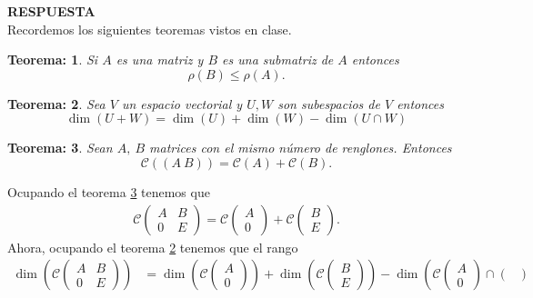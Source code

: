 \documentclass[11pt,letterpaper]{article}
\newcommand{\mcC}{\mathcal{C}}
\newcommand{\res}{\textbf{RESPUESTA}\\}
\newtheorem{thmt}{Teorema:}
\begin{document}
\begin{enumerate}
\res Recordemos los siguientes teoremas vistos en clase. 
\begin{framed}
    \begin{thmt} \label{submatriz}
	Si $A$ es una matriz y $B$ es una submatriz de $A$ entonces$$\rho(B)\leq \rho(A).$$
    \end{thmt}
\end{framed}

\begin{framed}
    \begin{thmt} \label{dimension_2}
	Sea $V$ un espacio vectorial y $U,W$ son subespacios de $V$ entonces 
	$$\dim(U+W)=\dim(U)+\dim(W)-\dim(U\cap W)$$
    \end{thmt}
\end{framed}

\begin{framed}
    \begin{thmt} \label{matrices}
	Sean $A, \ B$ matrices con el mismo número de renglones. Entonces
	$$\mcC((A\ B))=\mcC(A)+\mcC(B).$$
    \end{thmt}
\end{framed}
Ocupando el teorema \ref{matrices} tenemos que
\begin{align*}
\mcC\begin{pmatrix}
A&B\\
0&E
\end{pmatrix}=\mcC\begin{pmatrix}
A\\
0
\end{pmatrix}+\mcC\begin{pmatrix}
B\\
E
\end{pmatrix}.
\end{align*}
Ahora, ocupando el teorema \ref{dimension_2} tenemos que el rango 
\begin{align*}
\dim\left(\mcC\begin{pmatrix}
A&B\\
0&E
\end{pmatrix}\right)&=\dim\left(\mcC\begin{pmatrix}
A\\
0
\end{pmatrix}\right)+\dim\left(\mcC\begin{pmatrix}
B\\
E
\end{pmatrix}\right)-\dim\left(\mcC\begin{pmatrix}
A\\
0
\end{pmatrix}\cap \begin{pmatrix}

\end{pmatrix}
\end{align*}
\end{enumerate}
\end{document}
